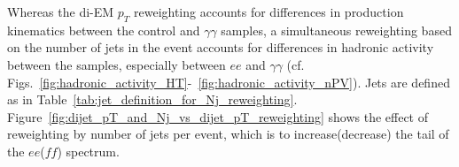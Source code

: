 \documentclass[dissertation_bw.tex]{subfiles}
\begin{document}
Whereas the di-EM $p_{T}$ reweighting accounts for differences in production kinematics between the control and $\gamma\gamma$ samples, a simultaneous reweighting based on the number of jets in the event accounts for differences in hadronic activity between the samples, especially between $ee$ and $\gamma\gamma$ (cf. Figs.~\ref{fig:hadronic_activity_HT}-~\ref{fig:hadronic_activity_nPV}).  Jets are defined as in Table~\ref{tab:jet_definition_for_Nj_reweighting}.  Figure~\ref{fig:dijet_pT_and_Nj_vs_dijet_pT_reweighting} shows the effect of reweighting by number of jets per event, which is to increase(decrease) the tail of the $ee$($\mathit{ff}$) \MET spectrum.

\begin{figure}
	\centering
	\hspace{1cm}

\end{figure}
\end{document}
